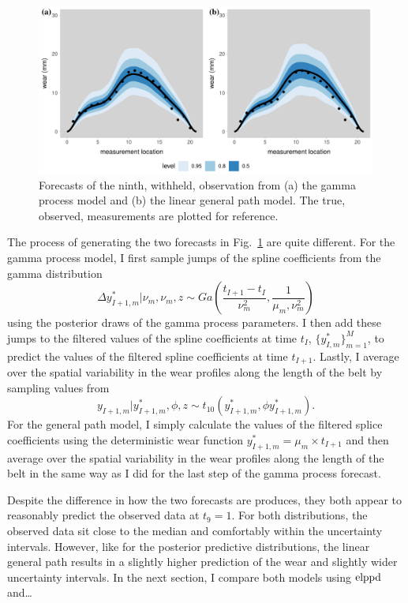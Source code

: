 \begin{figure}
  \centering
  \includegraphics[width=\textwidth]{figures/ch-6/belt_wear_forecasts.pdf}
  \caption{Forecasts of the ninth, withheld, observation from (a) the gamma process model and (b) the linear general path model. The true, observed, measurements are plotted for reference.}
  \label{fig:beltwear-forecasts}
\end{figure}

The process of generating the two forecasts in Fig.~\ref{fig:beltwear-forecasts} are quite different. For the gamma process model, I first sample jumps of the spline coefficients from the gamma distribution
\begin{equation}
  \Delta y^*_{I + 1, m}|\nu_m, \nu_m, z \sim Ga\left(\frac{t_{I + 1} - t_{I}}{\nu_m^2}, \frac{1}{\mu_m, \nu_m^2}\right)
\end{equation}
using the posterior draws of the gamma process parameters. I then add these jumps to the filtered values of the spline coefficients at time $t_I$, $\{y^*_{I, m}\}^M_{m = 1}$, to predict the values of the filtered spline coefficients at time $t_{I + 1}$. Lastly, I average over the spatial variability in the wear profiles along the length of the belt by sampling values from
\begin{equation}
  y_{I + 1, m}|y^*_{I + 1, m}, \phi, z \sim t_{10}(y^*_{I + 1, m}, \phi y^*_{I + 1, m}).
\end{equation}
For the general path model, I simply calculate the values of the filtered splice coefficients using the deterministic wear function $y^*_{I + 1, m} = \mu_m \times t_{I+1}$ and then average over the spatial variability in the wear profiles along the length of the belt in the same way as I did for the last step of the gamma process forecast.

Despite the difference in how the two forecasts are produces, they both appear to reasonably predict the observed data at $t_9 = 1$. For both distributions, the observed data sit close to the median and comfortably within the uncertainty intervals. However, like for the posterior predictive distributions, the linear general path results in a slightly higher prediction of the wear and slightly wider uncertainty intervals. In the next section, I compare both models using $\hbox{elppd}$ and\ldots 

